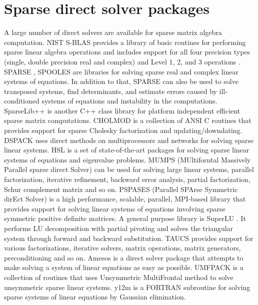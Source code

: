 \section{Sparse direct solver packages}
A large number of direct solvers are available for sparse matrix algebra computation. NIST S-BLAS provides a library of basic routines for performing sparse linear algebra operations and includes support for all four precision types (single, double precision real and complex) and Level 1, 2, and 3 operations \cite{duff}. SPARSE \cite{sparse}, SPOOLES \cite{spooles} are libraries for solving sparse real and complex linear systems of equations. In addition to that, SPARSE can also be used to solve transposed systems, find determinants, and estimate errors caused by ill-conditioned systems of equations and instability in the computations. SparseLib++ \cite{sparselib} is another C++ class library for platform independent efficient sparse matrix computations. CHOLMOD \cite{cholmod} is a collection of ANSI C routines that provides support for sparse Cholesky factorization and updating/downdating. DSPACK \cite{dspack} uses direct methods on multiprocessors and networks for solving sparse linear systems. HSL \cite{hsl} is a set of state-of-the-art packages for solving sparse linear systems of equations and eigenvalue problems. MUMPS (MUltiforntal Massively Parallel sparse direct Solver) \cite{mumps} can be used for solving large linear systems, parallel factorization, iterative refinement, backward error analysis, partial factorization, Schur complement matrix and so on. PSPASES (Parallel SPArse Symmetric dirEct Solver) \cite{pspases} is a high performance, scalable, parallel, MPI-based library that provides support for solving linear systems of equations involving sparse symmetric positive definite matrices. A general purpose library is SuperLU \cite{superlu}. It performs LU decomposition with partial pivoting and solves the triangular system through forward and backward substitution. TAUCS \cite{taucs} provides support for various factorizations, iterative solvers, matrix operations, matrix generators, preconditioning and so on. Amesos \cite{amesos} is a direct solver package that attempts to make solving a system of linear equations as easy as possible. UMFPACK \cite{umfpack} is a collection of routines that uses Unsymmetric MultiFrontal method to solve unsymmetric sparse linear systems. y12m \cite{y12m} is a FORTRAN subroutine for solving sparse systems of linear equations by Gaussian elimination.

